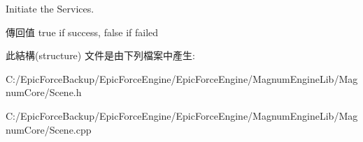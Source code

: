 Initiate the Services. 

\begin{DoxyReturn}{傳回值}
true if success, false if failed 
\end{DoxyReturn}


此結構(structure) 文件是由下列檔案中產生\+:\begin{DoxyCompactItemize}
\item 
C\+:/\+Epic\+Force\+Backup/\+Epic\+Force\+Engine/\+Epic\+Force\+Engine/\+Magnum\+Engine\+Lib/\+Magnum\+Core/Scene.\+h\item 
C\+:/\+Epic\+Force\+Backup/\+Epic\+Force\+Engine/\+Epic\+Force\+Engine/\+Magnum\+Engine\+Lib/\+Magnum\+Core/Scene.\+cpp\end{DoxyCompactItemize}
